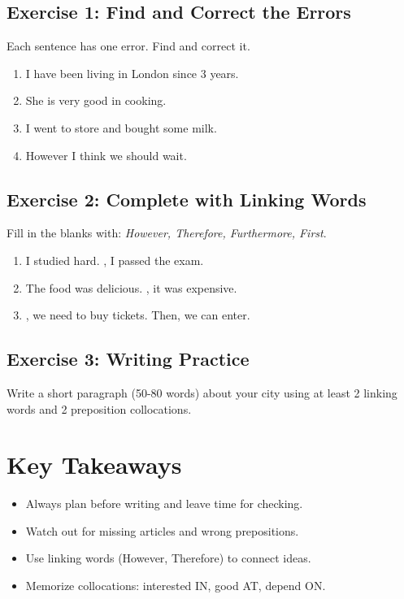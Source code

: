\subsection{Exercise 1: Find and Correct the Errors}
Each sentence has one error. Find and correct it.

\begin{enumerate}
    \item I have been living in London since 3 years.
    \item She is very good in cooking.
    \item I went to store and bought some milk.
    \item However I think we should wait.
\end{enumerate}

\subsection{Exercise 2: Complete with Linking Words}
Fill in the blanks with: \textit{However, Therefore, Furthermore, First}.

\begin{enumerate}
    \item I studied hard. \underline{\hspace{2cm}}, I passed the exam.
    \item The food was delicious. \underline{\hspace{2cm}}, it was expensive.
    \item \underline{\hspace{2cm}}, we need to buy tickets. Then, we can enter.
\end{enumerate}

\subsection{Exercise 3: Writing Practice}
Write a short paragraph (50-80 words) about your city using at least 2 linking words and 2 preposition collocations.

\begin{tcolorbox}[colback=white,height=5cm]
\end{tcolorbox}

\section{Key Takeaways}
\begin{itemize}
    \item Always plan before writing and leave time for checking.
    \item Watch out for missing articles and wrong prepositions.
    \item Use linking words (However, Therefore) to connect ideas.
    \item Memorize collocations: interested IN, good AT, depend ON.
\end{itemize}

